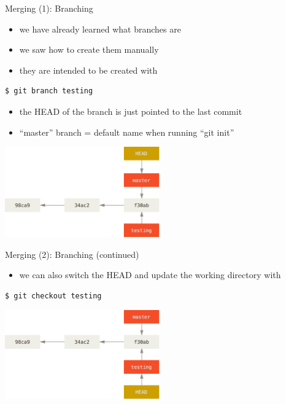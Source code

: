 \begin{frame}[fragile]{Merging (1): Branching}
  \begin{itemize}
    \item we have already learned what branches are
    \item we saw how to create them manually
    \item they are intended to be created with
    
  \end{itemize}

\begin{lstlisting}[style=ShellCmd]
$ git branch testing
\end{lstlisting}
  \begin{itemize}
    \item the HEAD of the branch is just pointed to the last commit
    \item ``master'' branch = default name when running ``git init''
  \end{itemize}
  
  \includegraphics[width=0.50\textwidth]{imgs/head_master}
\end{frame}
\begin{frame}[fragile]{Merging (2): Branching (continued)}
  \begin{itemize}
    \item we can also switch the HEAD and update the working directory with
  \end{itemize}

\begin{lstlisting}[style=ShellCmd]
$ git checkout testing
\end{lstlisting}
  \includegraphics[width=0.50\textwidth]{imgs/head_testing}
\end{frame}

